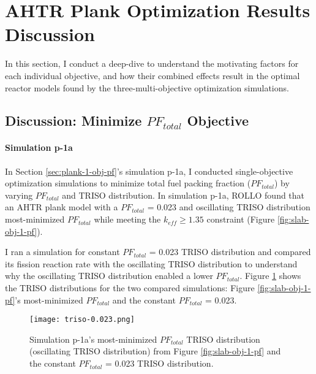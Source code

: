 \section{AHTR Plank Optimization Results Discussion}
\label{sec:plank-discussion}
In this section, I conduct a deep-dive to understand the motivating factors for 
each individual objective, and how their combined effects result in the optimal 
reactor models found by the three-multi-objective optimization simulations. 

\subsection{Discussion: Minimize $PF_{total}$ Objective}
\label{sec:plank-discussion-pf}
\paragraph{Simulation p-1a}
In Section \ref{sec:plank-1-obj-pf}'s simulation p-1a, I conducted single-objective 
optimization simulations to minimize total fuel packing fraction ($PF_{total}$) by 
varying $PF_{total}$ and TRISO distribution. 
In simulation p-1a, \gls{ROLLO} found that an \gls{AHTR} plank model with a
$PF_{total}$ = 0.023 and oscillating TRISO distribution most-minimized 
$PF_{total}$ while meeting the $k_{eff} \geq 1.35$ constraint 
(Figure \ref{fig:slab-obj-1-pf}). 

I ran a simulation for constant $PF_{total}$ = 0.023 TRISO distribution and compared its 
fission reaction rate with the oscillating TRISO distribution 
to understand why the oscillating TRISO distribution enabled a lower $PF_{total}$. 
Figure \ref{fig:triso-0.023} shows the TRISO distributions for the two compared 
simulations: Figure \ref{fig:slab-obj-1-pf}'s most-minimized $PF_{total}$ 
and the constant $PF_{total}$ = 0.023. 
\begin{figure}[htbp!]
    \centering
    \texttt{[image: triso-0.023.png]} 
    \caption{Simulation p-1a's most-minimized $PF_{total}$ TRISO distribution 
    (oscillating TRISO distribution) from Figure \ref{fig:slab-obj-1-pf} and the 
    constant $PF_{total}$ = 0.023 TRISO distribution.}
    \label{fig:triso-0.023}
\end{figure}

